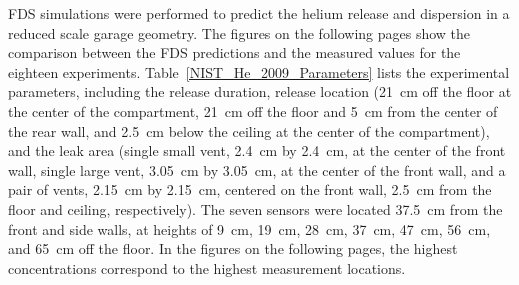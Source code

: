 FDS simulations were performed to predict the helium release and dispersion in a reduced scale garage geometry. The figures on the following pages show the comparison between the FDS predictions and the measured values for the eighteen experiments. Table~\ref{NIST_He_2009_Parameters} lists the experimental parameters, including the release duration, release location (21~cm off the floor at the center of the compartment, 21~cm off the floor and 5~cm from the center of the rear wall, and 2.5~cm below the ceiling at the center of the compartment), and the leak area (single small vent, 2.4~cm by 2.4~cm, at the center of the front wall, single large vent, 3.05~cm by 3.05~cm, at the center of the front wall, and a pair of vents, 2.15~cm by 2.15~cm, centered on the front wall, 2.5~cm from the floor and ceiling, respectively). The seven sensors were located 37.5~cm from the front and side walls, at heights of 9~cm, 19~cm, 28~cm, 37~cm, 47~cm, 56~cm, and 65~cm off the floor. In the figures on the following pages, the highest concentrations correspond to the highest measurement locations.

